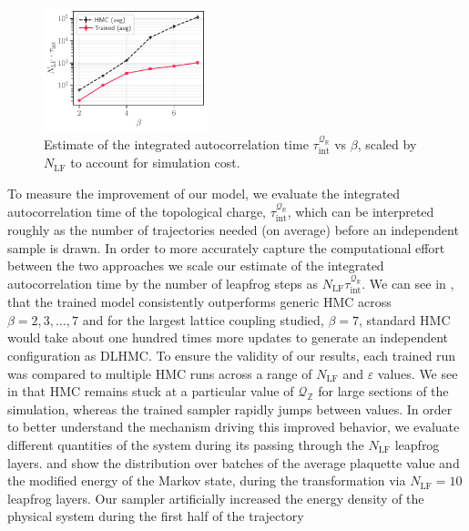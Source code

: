 \documentclass{article} %
\begin{document}
\begin{figure}
   \centering
      \centering
      \includegraphics[width=0.425\textwidth]{figures/autocorr_vs_beta.pdf}
      \caption{\label{fig:autocorrvsbeta}Estimate of the integrated autocorrelation time
      \(\tau_{\mathrm{int}}^{\mathcal{Q}_{\mathbb{R}}}\) vs \(\beta\), scaled by \(N_{\mathrm{LF}}\) to account for
   simulation cost.}
\end{figure}
To measure the improvement of our model, we evaluate the integrated autocorrelation time of the topological charge, $\tau_{\mathrm{int}}^{\mathcal{Q}_{\mathbb{R}}}$, which
can be interpreted roughly as the number of trajectories needed (on average) before an independent sample is drawn.
%
In order to more accurately capture the computational effort between the two approaches we scale our estimate of the
integrated autocorrelation time by the number of leapfrog steps as \(N_{\mathrm{LF}}\tau_{\mathrm{int}}^{\mathcal{Q}_{\mathbb{R}}}\).
We can see in
, that the trained model consistently outperforms generic HMC across \(\beta = 2, 3, \ldots, 7\) and for the largest
lattice coupling studied, $\beta=7$, standard HMC would take about one hundred times more updates to generate an independent configuration as DLHMC.
%
To ensure the validity of our results, each trained run was compared to multiple HMC runs across a range of
\(N_{\mathrm{LF}}\) and \(\varepsilon\) values.
%
We see in  that HMC remains stuck at a particular value of \(\mathcal{Q}_{\mathbb{Z}}\) for large
sections of the simulation, whereas the trained sampler rapidly jumps between values.
%
In order to better understand the mechanism driving this improved behavior, we evaluate different quantities of the
system during its passing through the $N_{\mathrm{LF}}$ leapfrog layers.
%
 and  show the distribution over batches of the average plaquette value and the
modified energy of the Markov state, during the transformation via $N_{\mathrm{LF}}=10$ leapfrog layers.
%
Our sampler artificially increased the energy density of the physical system during the first half of the trajectory
\end{document}

